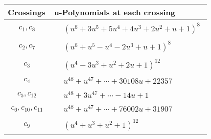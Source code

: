 \documentclass[1p]{elsarticle_modified}
\theoremstyle{definition}
\begin{document}
\begin{tabular}{m{50pt}|m{274pt}}
Crossings & \hspace{64pt}u-Polynomials at each crossing \\
\hline $$\begin{aligned}c_{1},c_{8}\end{aligned}$$&$\begin{aligned}
&(u^6+3 u^5+5 u^4+4 u^3+2 u^2+u+1)^8
\end{aligned}$\\
\hline $$\begin{aligned}c_{2},c_{7}\end{aligned}$$&$\begin{aligned}
&(u^6+u^5- u^4-2 u^3+u+1)^8
\end{aligned}$\\
\hline $$\begin{aligned}c_{3}\end{aligned}$$&$\begin{aligned}
&(u^4-3 u^3+u^2+2 u+1)^{12}
\end{aligned}$\\
\hline $$\begin{aligned}c_{4}\end{aligned}$$&$\begin{aligned}
&u^{48}+u^{47}+\cdots+30108 u+22357
\end{aligned}$\\
\hline $$\begin{aligned}c_{5},c_{12}\end{aligned}$$&$\begin{aligned}
&u^{48}+3 u^{47}+\cdots-14 u+1
\end{aligned}$\\
\hline $$\begin{aligned}c_{6},c_{10},c_{11}\end{aligned}$$&$\begin{aligned}
&u^{48}+u^{47}+\cdots+76002 u+31907
\end{aligned}$\\
\hline $$\begin{aligned}c_{9}\end{aligned}$$&$\begin{aligned}
&(u^4+u^3+u^2+1)^{12}
\end{aligned}$\\
\hline
\end{tabular}\\~\\
\newpage\renewcommand{\arraystretch}{1}
\end{document}
